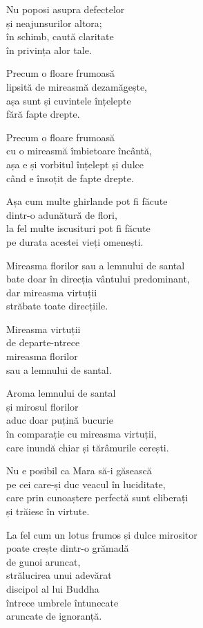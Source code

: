 Nu poposi asupra defectelor\\
și neajunsurilor altora;\\
în schimb, caută claritate\\
în privința alor tale.


Precum o floare frumoasă\\
lipsită de mireasmă dezamăgește,\\
așa sunt și cuvintele înțelepte\\
fără fapte drepte.



Precum o floare frumoasă\\
cu o mireasmă îmbietoare încântă,\\
așa e și vorbitul înțelept și dulce\\
când e însoțit de fapte drepte.


Așa cum multe ghirlande pot fi făcute\\
dintr-o adunătură de flori,\\
la fel multe iscusituri pot fi făcute\\
pe durata acestei vieți omenești.


Mireasma florilor sau a lemnului de santal\\
bate doar în direcția vântului predominant,\\
dar mireasma virtuții\\
străbate toate direcțiile.


Mireasma virtuții\\
de departe-ntrece\\
mireasma florilor\\
sau a lemnului de santal.


Aroma lemnului de santal\\
și mirosul florilor\\
aduc doar puțină bucurie\\
în comparație cu mireasma virtuții,\\
care inundă chiar și tărâmurile cerești.


Nu e posibil ca Mara să-i găsească\\
pe cei care-și duc veacul în luciditate,\\
care prin cunoaștere perfectă sunt eliberați\\
și trăiesc în virtute.

La fel cum un lotus frumos și dulce mirositor\\
poate crește dintr-o grămadă\\
de gunoi aruncat,\\
strălucirea unui adevărat\\
discipol al lui Buddha\\
întrece umbrele întunecate\\
aruncate de ignoranță.
